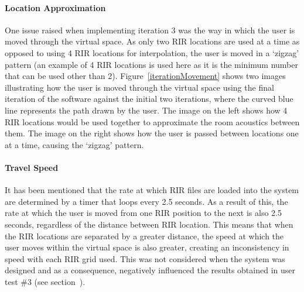 \documentclass[../../main.tex]{subfiles}
\begin{document}
		\paragraph{Location Approximation}
		One issue raised when implementing iteration 3 was the way in which the user is moved through the virtual space. As only two \ac{RIR} locations are used at a time as opposed to using 4 \ac{RIR} locations for interpolation, the user is moved in a `zigzag' pattern (an example of 4 \ac{RIR} locations is used here as it is the minimum number that can be used other than 2). Figure~\ref{iterationMovement} shows two images illustrating how the user is moved through the virtual space using the final iteration of the software against the initial two iterations, where the curved blue line represents the path drawn by the user. The image on the left shows how 4 \ac{RIR} locations would be used together to approximate the room acoustics between them. The image on the right shows how the user is passed between locations one at a time, causing the `zigzag' pattern.

		\paragraph{Travel Speed}

		It has been mentioned that the rate at which \ac{RIR} files are loaded into the system are determined by a timer that loops every 2.5 seconds. As a result of this, the rate at which the user is moved from one \ac{RIR} position to the next is also 2.5 seconds, regardless of the distance between \ac{RIR} location. This means that when the \ac{RIR} locations are separated by a greater distance, the speed at which the user moves within the virtual space is also greater, creating an inconsistency in speed with each \ac{RIR} grid used. This was not considered when the system was designed and as a consequence, negatively influenced the results obtained in user test \#3 (see section~).
\end{document}

